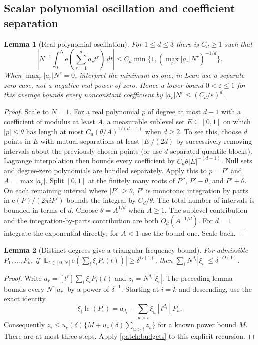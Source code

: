 \documentclass[11pt]{article}
\newtheorem{lemma}[lemma]{Lemma}
\theoremstyle{definition}
\newcommand{\ee}[1]{\mathrm e\!\left(#1\right)}
\begin{document}
\subsection{Scalar polynomial oscillation and coefficient separation}
\begin{lemma}[Real polynomial oscillation]\label{lem:real-polynomial-oscillation}
For $1\leq d\leq3$ there is $C_d\geq1$ such that
\[
 \left|N^{-1}\int_0^N\ee{\sum_{r=1}^d a_rt^r}\,dt\right|
 \leq C_d\min\{1,(\max_r|a_r|N^r)^{-1/d}\}.
\]
When $\max_r|a_r|N^r=0$, interpret the minimum as one; in Lean use a separate zero case,
not a negative real power of zero.  Hence a lower bound $0<\varepsilon\leq1$ for this average bounds every nonconstant coefficient
by $|a_r|N^r\leq (C_d/\varepsilon)^d$.
\end{lemma}
\begin{proof}
Scale to $N=1$.  For a real polynomial $p$ of degree at most $d-1$ with a coefficient of
modulus at least $A$, a measurable sublevel set $E\subseteq[0,1]$ on which $|p|\leq\theta$
has length at most $C_d(\theta/A)^{1/(d-1)}$ when $d\geq2$.
To see this, choose $d$ points in $E$ with mutual separations at least $|E|/(2d)$ by successively
removing intervals about the previously chosen points (or use $d$ separated quantile blocks).
Lagrange interpolation then bounds every coefficient by $C_d\theta|E|^{-(d-1)}$.
Null sets and degree-zero polynomials are handled separately.
Apply this to $p=P'$ and $A=\max|a_r|$.  Split $[0,1]$ at the finitely many roots of
$P''$, $P'-\theta$, and $P'+\theta$.  On each remaining interval where $|P'|\geq\theta$,
$P'$ is monotone; integration by parts in $\ee{P}/(2\pi iP')$ bounds the integral by
$C_d/\theta$.  The total number of intervals is bounded in terms of $d$.
Choose $\theta=A^{1/d}$ when $A\geq1$.  The sublevel contribution and the integration-by-parts
contribution are both $O_d(A^{-1/d})$.  For $d=1$ integrate the exponential directly;
for $A<1$ use the bound one.  Scale back.
\end{proof}

\begin{lemma}[Distinct degrees give a triangular frequency bound]\label{patch:triangular}
For admissible $P_1,\ldots,P_k$, if
$|\mathbb E_{t\in[0,N]}\ee{\sum_i\xi_iP_i(t)}|\geq\delta^{O(1)}$, then
$\sum_iN^{d_i}|\xi_i|\leq\delta^{-O(1)}$.
\end{lemma}
\begin{proof}
Write $a_r=[t^r]\sum_i\xi_iP_i(t)$ and $z_i=N^{d_i}|\xi_i|$.
The preceding lemma bounds every $N^r|a_r|$ by a power of $\delta^{-1}$.
Starting at $i=k$ and descending, use the exact identity
\[
 \xi_i\operatorname{lc}(P_i)=a_{d_i}-\sum_{u>i}\xi_u[t^{d_i}]P_u.
\]
Consequently $z_i\leq u_c(\delta)\{M+u_c(\delta)\sum_{u>i}z_u\}$ for a known power bound $M$.
There are at most three steps.  Apply \cref{patch:budgets} to this explicit recursion.
\end{proof}
\end{document}
